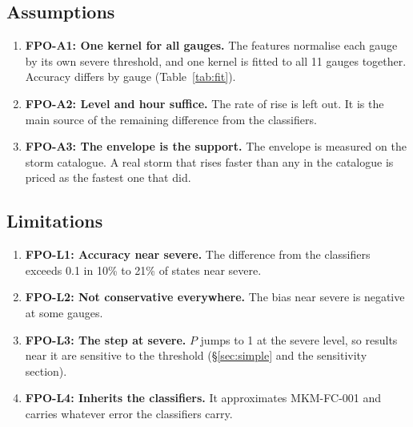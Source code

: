 \documentclass[11pt,a4paper]{article}
\newcommand{\fpNearOverLo}{10}
\newcommand{\fpNearOverHi}{21}
\begin{document}
\mkmlimitations

\subsection{Assumptions}
\begin{enumerate}[nosep]
    \item \textbf{FPO-A1: One kernel for all gauges.} The features normalise each
          gauge by its own severe threshold, and one kernel is fitted to all 11 gauges
          together. Accuracy differs by gauge (Table~\ref{tab:fit}).
    \item \textbf{FPO-A2: Level and hour suffice.} The rate of rise is left out. It is
          the main source of the remaining difference from the classifiers.
    \item \textbf{FPO-A3: The envelope is the support.} The envelope is measured on
          the storm catalogue. A real storm that rises faster than any in the
          catalogue is priced as the fastest one that did.
\end{enumerate}

\subsection{Limitations}
\begin{enumerate}[nosep]
    \item \textbf{FPO-L1: Accuracy near severe.} The difference from the classifiers
          exceeds 0.1 in \fpNearOverLo\% to \fpNearOverHi\% of states near severe.
    \item \textbf{FPO-L2: Not conservative everywhere.} The bias near severe is
          negative at some gauges.
    \item \textbf{FPO-L3: The step at severe.} $P$ jumps to 1 at the severe level, so
          results near it are sensitive to the threshold (\S\ref{sec:simple} and the
          sensitivity section).
    \item \textbf{FPO-L4: Inherits the classifiers.} It approximates MKM-FC-001 and
          carries whatever error the classifiers carry.
\end{enumerate}

\mkmgovernance
\end{document}
